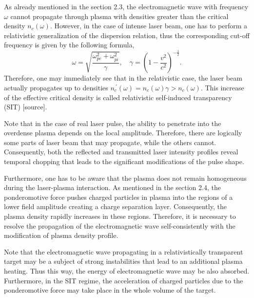 As already mentioned in the section 2.3, the electromagnetic wave with frequency $ \omega $ cannot propagate through plasma with densities greater than the critical density $ n_c \left( \omega \right) $. However, in the case of intense laser beam, one has to perform a relativistic generalization of the dispersion relation, thus the corresponding cut-off frequency is given by the following formula,
\begin{equation}
\label{2.6.1}
\omega = \sqrt{\frac{\omega_{pe}^2 + \omega_{pi}^2}{\gamma}}, \quad \gamma = \left( 1 - \frac{v^{2}}{c^2} \right)^{-\frac{1}{2}}.
\end{equation}
Therefore, one may immediately see that in the relativistic case, the laser beam actually propagates up to densities $ n_c^{\: \prime} \left( \omega \right) = n_c \left( \omega \right) \gamma > n_c \left( \omega \right) $. This increase of the effective critical density is called relativistic self-induced transparency (SIT) [source].

Note that in the case of real laser pulse, the ability to penetrate into the overdense plasma depends on the local amplitude. Therefore, there are logically some parts of laser beam that may propagate, while the others cannot. Consequently, both the reflected and transmitted laser intensity profiles reveal temporal chopping that leads to the significant modifications of the pulse shape.

Furthermore, one has to be aware that the plasma does not remain homogeneous during the laser-plasma interaction. As mentioned in the section 2.4, the ponderomotive force pushes charged particles in plasma into the regions of a lower field amplitude creating a charge separation layer. Consequently, the plasma density rapidly increases in these regions. Therefore, it is necessary to resolve the propagation of the electromagnetic wave self-consistently with the modification of plasma density profile.

Note that the electromagnetic wave propagating in a relativistically transparent target may be a subject of strong instabilities that lead to an additional plasma heating. Thus this way, the energy of electromagnetic wave may be also absorbed. Furthermore, in the SIT regime, the acceleration of charged particles due to the ponderomotive force may take place in the whole volume of the target.

